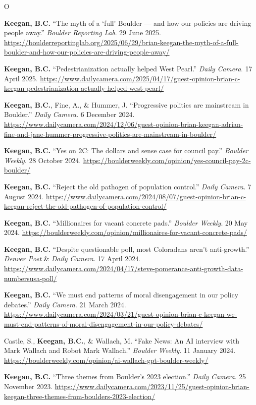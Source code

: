 \documentclass{cv}
\begin{document}
\begin{entries}{O}
		\item \textbf{Keegan, B.C.} ``The myth of a `full' Boulder --- and how our policies are driving people away.'' \textit{Boulder Reporting Lab}. 29 June 2025. \url{https://boulderreportinglab.org/2025/06/29/brian-keegan-the-myth-of-a-full-boulder-and-how-our-policies-are-driving-people-away/}
		\item \textbf{Keegan, B.C.} ``Pedestrianization actually helped West Pearl.'' \textit{Daily Camera}. 17 April 2025. \url{https://www.dailycamera.com/2025/04/17/guest-opinion-brian-c-keegan-pedestrianization-actually-helped-west-pearl/}
		\item \textbf{Keegan, B.C.}, Fine, A., \& Hummer, J. ``Progressive politics are mainstream in Boulder.'' \textit{Daily Camera}. 6 December 2024. \url{https://www.dailycamera.com/2024/12/06/guest-opinion-brian-keegan-adrian-fine-and-jane-hummer-progressive-politics-are-mainstream-in-boulder/}
		\item \textbf{Keegan, B.C.} ``Yes on 2C: The dollars and sense case for council pay.'' \textit{Boulder Weekly}. 28 October 2024. \url{https://boulderweekly.com/opinion/yes-council-pay-2c-boulder/}
		\item \textbf{Keegan, B.C.} ``Reject the old pathogen of population control.'' \textit{Daily Camera}. 7 August 2024. \url{https://www.dailycamera.com/2024/08/07/guest-opinion-brian-c-keegan-reject-the-old-pathogen-of-population-control/}
		\item \textbf{Keegan, B.C.} ``Millionaires for vacant concrete pads.'' \textit{Boulder Weekly}. 20 May 2024. \url{https://boulderweekly.com/opinion/millionaires-for-vacant-concrete-pads/}
		\item \textbf{Keegan, B.C.} ``Despite questionable poll, most Coloradans aren't anti-growth.'' \textit{Denver Post} \& \textit{Daily Camera}. 17 April 2024. \url{https://www.dailycamera.com/2024/04/17/steve-pomerance-anti-growth-data-numbersusa-poll/}
		\item \textbf{Keegan, B.C.} ``We must end patterns of moral disengagement in our policy debates.'' \textit{Daily Camera}. 21 March 2024. \url{https://www.dailycamera.com/2024/03/21/guest-opinion-brian-c-keegan-we-must-end-patterns-of-moral-disengagement-in-our-policy-debates/}
		\item Castle, S., \textbf{Keegan, B.C.}, \& Wallach, M. ``Fake News: An AI interview with Mark Wallach and Robot Mark Wallach.'' \textit{Boulder Weekly}. 11 January 2024.  \url{https://boulderweekly.com/opinion/ai-wallach-gpt-boulder-weekly/}
		\item \textbf{Keegan, B.C.} ``Three themes from Boulder's 2023 election.'' \textit{Daily Camera}. 25 November 2023. \url{https://www.dailycamera.com/2023/11/25/guest-opinion-brian-keegan-three-themes-from-boulders-2023-election/}

\end{entries}
\end{document}
